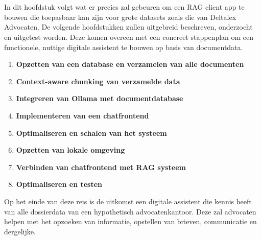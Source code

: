 
\chapter{}%
\label{ch:methodologie}


In dit hoofdstuk volgt wat er precies zal gebeuren om een RAG client app te bouwen die toepasbaar kan zijn voor grote datasets zoals die van Deltalex Advocaten. 
De volgende hoofdstukken zullen uitgebreid beschreven, onderzocht en uitgetest worden. 
Deze komen overeen met een concreet stappenplan om een functionele, nuttige digitale assistent te bouwen op basis van documentdata. 

\begin{enumerate}
    \item \textbf{Opzetten van een database en verzamelen van alle documenten}
    \item \textbf{Context-aware chunking van verzamelde data}
    \item \textbf{Integreren van Ollama met documentdatabase}
    \item \textbf{Implementeren van een chatfrontend}
    \item \textbf{Optimaliseren en schalen van het systeem}
    \item \textbf{Opzetten van lokale omgeving}
    \item \textbf{Verbinden van chatfrontend met RAG systeem}
    \item \textbf{Optimaliseren en testen}
\end{enumerate} 

Op het einde van deze reis is de uitkomst een digitale assistent die kennis heeft van alle dossierdata van een hypothetisch advocatenkantoor. 
Deze zal advocaten helpen met het opzoeken van informatie, opstellen van brieven, communicatie en dergelijke. 


